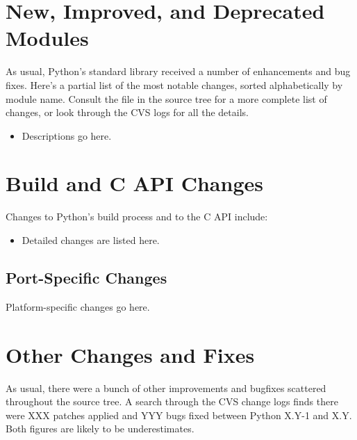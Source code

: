 \documentclass{howto}
\begin{document}
\section{New, Improved, and Deprecated Modules}

As usual, Python's standard library received a number of enhancements and
bug fixes.  Here's a partial list of the most notable changes, sorted
alphabetically by module name. Consult the
 file in the source tree for a more
complete list of changes, or look through the CVS logs for all the
details.

\begin{itemize}

\item Descriptions go here.

\end{itemize}




\section{Build and C API Changes}

Changes to Python's build process and to the C API include:

\begin{itemize}

\item Detailed changes are listed here.

\end{itemize}


\subsection{Port-Specific Changes}

Platform-specific changes go here.


\section{Other Changes and Fixes \label{section-other}}

As usual, there were a bunch of other improvements and bugfixes
scattered throughout the source tree.  A search through the CVS change
logs finds there were XXX patches applied and YYY bugs fixed between
Python X.Y-1 and X.Y.  Both figures are likely to be underestimates.
\end{document}
